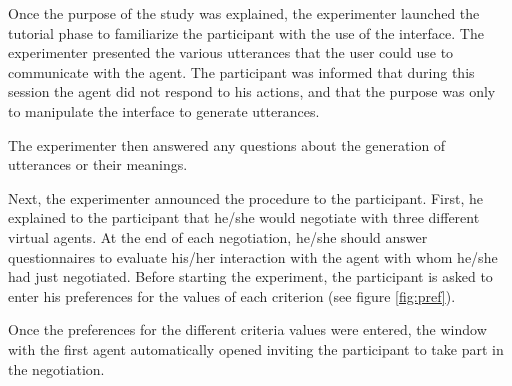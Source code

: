 \documentclass[10pt, a4paper]{article} %
\begin{document}
		
		Once the purpose of the study was explained, the experimenter launched the tutorial phase to familiarize the participant with the use of the interface. The experimenter presented the various utterances that the user could use to communicate with the agent. 	
		The participant was informed that during this session the agent did not respond to his actions, and that the purpose was only to manipulate the interface to generate utterances. 
		
		The experimenter then answered any questions about the generation of utterances or their meanings.
		
		Next, the experimenter announced the procedure to the participant. First, he explained to the participant that he/she would negotiate with three different virtual agents. At the end of each negotiation, he/she should answer  questionnaires to evaluate his/her interaction with the agent with whom he/she had just negotiated.
		Before starting the experiment, the participant is asked to enter his preferences for the values of each criterion (see figure \ref{fig:pref}).
		
		Once the preferences for the different criteria values were entered, the window with the first agent automatically opened inviting the participant to take part in the negotiation. 
		
			
			
\end{document}
